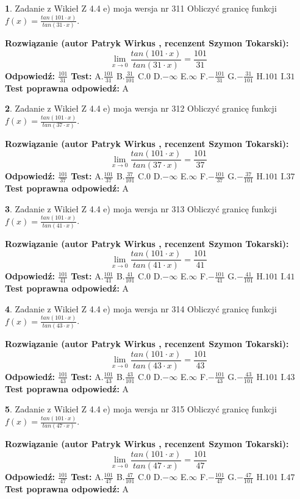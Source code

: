 \documentclass[12pt, a4paper]{article}
\theoremstyle{definition} %
\newtheorem{zad}{}
\newcommand{\zadStart}[1]{\begin{zad}#1\newline}
\newcommand{\zadStop}{\end{zad}}
\newcommand{\rozwStart}[2]{\noindent \textbf{Rozwiązanie (autor #1 , recenzent #2): }\newline}
\newcommand{\rozwStop}{\newline}
\newcommand{\odpStart}{\noindent \textbf{Odpowiedź:}\newline}
\newcommand{\odpStop}{\newline}
\newcommand{\testStart}{\noindent \textbf{Test:}\newline}
\newcommand{\testStop}{\newline}
\newcommand{\kluczStart}{\noindent \textbf{Test poprawna odpowiedź:}\newline}
\newcommand{\kluczStop}{\newline}
\begin{document}
\zadStart{Zadanie z Wikieł Z 4.4 e) moja wersja nr 311}
Obliczyć granicę funkcji $f(x)=\frac{tan(101\cdot x)}{tan(31\cdot x)}$.
\zadStop
\rozwStart{Patryk Wirkus}{Szymon Tokarski}
$$\lim\limits_{x\to 0}\frac{tan(101\cdot x)}{tan(31\cdot x)}=
\frac{101}{31}$$
\rozwStop
\odpStart
$\frac{101}{31}$
\odpStop
\testStart
A.$\frac{101}{31}$
B.$\frac{31}{101}$
C.$0$
D.$-\infty$
E.$\infty$
F.$-\frac{101}{31}$
G.$-\frac{31}{101}$
H.$101$
I.$31$
\testStop
\kluczStart
A
\kluczStop



\zadStart{Zadanie z Wikieł Z 4.4 e) moja wersja nr 312}
Obliczyć granicę funkcji $f(x)=\frac{tan(101\cdot x)}{tan(37\cdot x)}$.
\zadStop
\rozwStart{Patryk Wirkus}{Szymon Tokarski}
$$\lim\limits_{x\to 0}\frac{tan(101\cdot x)}{tan(37\cdot x)}=
\frac{101}{37}$$
\rozwStop
\odpStart
$\frac{101}{37}$
\odpStop
\testStart
A.$\frac{101}{37}$
B.$\frac{37}{101}$
C.$0$
D.$-\infty$
E.$\infty$
F.$-\frac{101}{37}$
G.$-\frac{37}{101}$
H.$101$
I.$37$
\testStop
\kluczStart
A
\kluczStop



\zadStart{Zadanie z Wikieł Z 4.4 e) moja wersja nr 313}
Obliczyć granicę funkcji $f(x)=\frac{tan(101\cdot x)}{tan(41\cdot x)}$.
\zadStop
\rozwStart{Patryk Wirkus}{Szymon Tokarski}
$$\lim\limits_{x\to 0}\frac{tan(101\cdot x)}{tan(41\cdot x)}=
\frac{101}{41}$$
\rozwStop
\odpStart
$\frac{101}{41}$
\odpStop
\testStart
A.$\frac{101}{41}$
B.$\frac{41}{101}$
C.$0$
D.$-\infty$
E.$\infty$
F.$-\frac{101}{41}$
G.$-\frac{41}{101}$
H.$101$
I.$41$
\testStop
\kluczStart
A
\kluczStop



\zadStart{Zadanie z Wikieł Z 4.4 e) moja wersja nr 314}
Obliczyć granicę funkcji $f(x)=\frac{tan(101\cdot x)}{tan(43\cdot x)}$.
\zadStop
\rozwStart{Patryk Wirkus}{Szymon Tokarski}
$$\lim\limits_{x\to 0}\frac{tan(101\cdot x)}{tan(43\cdot x)}=
\frac{101}{43}$$
\rozwStop
\odpStart
$\frac{101}{43}$
\odpStop
\testStart
A.$\frac{101}{43}$
B.$\frac{43}{101}$
C.$0$
D.$-\infty$
E.$\infty$
F.$-\frac{101}{43}$
G.$-\frac{43}{101}$
H.$101$
I.$43$
\testStop
\kluczStart
A
\kluczStop



\zadStart{Zadanie z Wikieł Z 4.4 e) moja wersja nr 315}
Obliczyć granicę funkcji $f(x)=\frac{tan(101\cdot x)}{tan(47\cdot x)}$.
\zadStop
\rozwStart{Patryk Wirkus}{Szymon Tokarski}
$$\lim\limits_{x\to 0}\frac{tan(101\cdot x)}{tan(47\cdot x)}=
\frac{101}{47}$$
\rozwStop
\odpStart
$\frac{101}{47}$
\odpStop
\testStart
A.$\frac{101}{47}$
B.$\frac{47}{101}$
C.$0$
D.$-\infty$
E.$\infty$
F.$-\frac{101}{47}$
G.$-\frac{47}{101}$
H.$101$
I.$47$
\testStop
\kluczStart
A
\kluczStop
\end{document}
